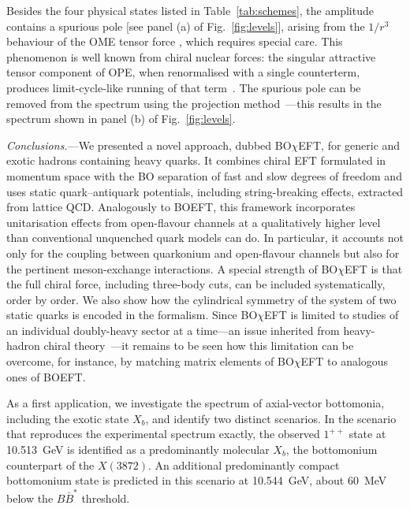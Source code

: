 \documentclass[aps,prl,showpacs,amsmath,twocolumn,superscriptaddress,floatfix,nofootinbib,notitlepage]{revtex4-2}
\newcommand{\X}{X(3872)}
\newcommand{\Xb}{X_b}
\newcommand{\BOchiEFT}{BO$\chi$EFT\xspace}
\begin{document}
Besides the four physical states listed in Table~\ref{tab:schemes}, the amplitude contains a spurious pole [see panel (a) of Fig.~\ref{fig:levels}], arising from the $1/r^3$ behaviour of the OME tensor force \cite{Ericson:1988gk,
Tornqvist:1993ng,Thomas:2008ja}, which requires special care. This phenomenon is well known from chiral nuclear forces: the singular attractive tensor component of OPE, when renormalised with a single counterterm, produces limit-cycle-like running of that term~\cite{Wilson:1970ag,Bedaque:1998kg,Beane:2001bc,Beane:2000wh,Nogga:2005hy,Epelbaum:2002ji,Birse:2005um}. The spurious pole can be removed from the spectrum using the projection method~\cite{Kukulin:1978he,Epelbaum:2002ji,Nogga:2005hy,Yang:2020pgi}---this results in the spectrum shown in panel (b) of Fig.~\ref{fig:levels}.

{\it Conclusions.}---We presented a novel approach, dubbed \BOchiEFT, for generic and exotic hadrons containing heavy quarks. It combines chiral EFT formulated in momentum space with the BO separation of fast and slow degrees of freedom and uses static quark--antiquark potentials, including string-breaking effects, extracted from lattice QCD. 
Analogously to BOEFT, 
this framework incorporates unitarisation effects from open-flavour channels at a qualitatively higher level than conventional unquenched quark models can do. In particular, it accounts not only for the coupling between quarkonium and open-flavour channels but also for the pertinent meson-exchange interactions.
A special strength of \BOchiEFT is that the full chiral force, 
including three-body cuts, can be included systematically, order by order. We also show how the cylindrical symmetry of the system of two static quarks is encoded in the formalism. Since \BOchiEFT
is limited to studies of an
individual doubly-heavy sector at a time---an issue inherited from heavy-hadron chiral theory~\cite{Baru:2018qkb}---it remains to be seen how this limitation can be overcome, for instance, by matching matrix elements of \BOchiEFT to analogous ones of BOEFT. 

As a first application, we investigate the spectrum of axial-vector bottomonia, including the exotic state $\Xb$, and identify two distinct scenarios. In the scenario that reproduces the experimental spectrum exactly, the observed $1^{++}$ state at 10.513~GeV is identified as a predominantly molecular $\Xb$, the bottomonium counterpart of the $\X$. An additional predominantly compact bottomonium state is predicted in this scenario at 10.544~GeV, about 60~MeV below the $B\bar{B}^*$ threshold.
\end{document}
